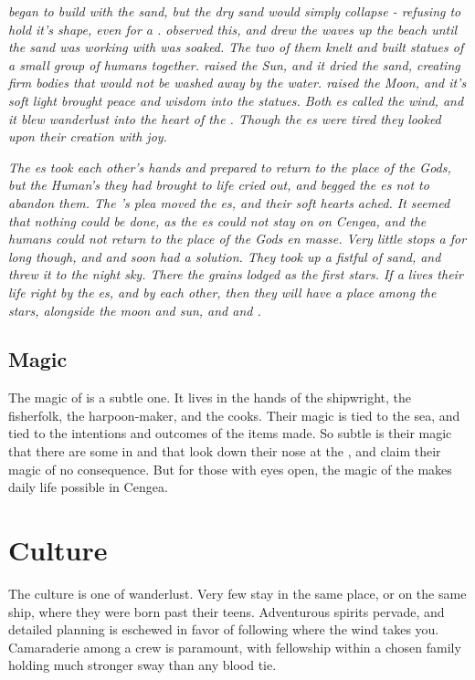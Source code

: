 \documentclass[blue]{GL2020}
\begin{document}
\emph{\cFlow{} began to build with the sand, but the dry sand would simply collapse - refusing to hold it's shape, even for a \cFlow{\God}. \cEbb{} observed this, and drew the waves up the beach until the sand \cFlow{} was working with was soaked. The two of them knelt and built statues of a small group of humans together. \cFlow{} raised the Sun, and it dried the sand, creating firm bodies that would not be washed away by the water. \cEbb{} raised the Moon, and it's soft light brought peace and wisdom into the statues. Both \cEbb{\God}es called the wind, and it blew wanderlust into the heart of the \pShippies{}. Though the \cEbb{\God}es were tired they looked upon their creation with joy.}

\emph{The \cEbb{\God}es took each other's hands and prepared to return to the place of the Gods, but the Human's they had brought to life cried out, and begged the \cEbb{\God}es not to abandon them. The \pShippies{}'s plea moved the \cEbb{\God}es, and their soft hearts ached. It seemed that nothing could be done, as the \cEbb{\God}es could not stay on on Cengea, and the humans could not return to the place of the Gods en masse. Very little stops a \cEbb{\God} for long though, and \cEbb{} and \cFlow{} soon had a solution. They took up a fistful of sand, and threw it to the night sky. There the grains lodged as the first stars. If a \pShippies{} lives their life right by the \cEbb{\God}es, and by each other, then they will have a place among the stars, alongside the moon and sun, and \cEbb{} and \cFlow{}.}

\subsection*{Magic}
The magic of \pShip{} is a subtle one. It lives in the hands of the shipwright, the fisherfolk, the harpoon-maker, and the cooks. Their magic is tied to the sea, and tied to the intentions and outcomes of the items made. So subtle is their magic that there are some in \pFarm{} and \pTech{} that look down their nose at the \pShippies{}, and claim their magic of no consequence. But for those with eyes open, the magic of the \pShippies{} makes daily life possible in Cengea.

\section*{Culture}
The \pShip{} culture is one of wanderlust. Very few \pShippies{} stay in the same place, or on the same ship, where they were born past their teens. Adventurous spirits pervade, and detailed planning is eschewed in favor of following where the wind takes you. Camaraderie among a crew is paramount, with fellowship within a chosen family holding much stronger sway than any blood tie.
\end{document}
